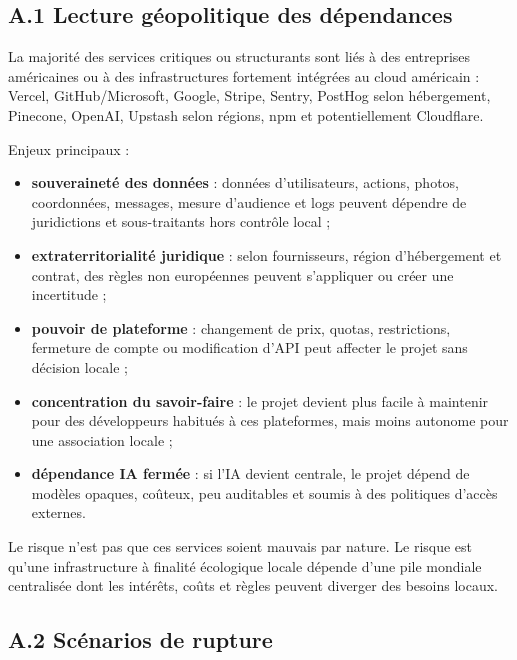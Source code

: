 \documentclass[
  10pt,
  a4paper,
  DIV=11,
  numbers=noendperiod,
  oneside]{scrreprt}
\providecommand{\tightlist}{%
  \setlength{\itemsep}{0pt}\setlength{\parskip}{0pt}}
\let\oldtextbf\textbf
\renewcommand{\textbf}[1]{\oldtextbf{\textcolor{cmmnavy}{#1}}}
\begin{document}
\subsection{A.1 Lecture géopolitique des
dépendances}\label{a.1-lecture-guxe9opolitique-des-duxe9pendances}

La majorité des services critiques ou structurants sont liés à des
entreprises américaines ou à des infrastructures fortement intégrées au
cloud américain : Vercel, GitHub/Microsoft, Google, Stripe, Sentry,
PostHog selon hébergement, Pinecone, OpenAI, Upstash selon régions, npm
et potentiellement Cloudflare.

Enjeux principaux :

\begin{itemize}
\tightlist
\item
  \textbf{souveraineté des données} : données d'utilisateurs, actions,
  photos, coordonnées, messages, mesure d'audience et logs peuvent
  dépendre de juridictions et sous-traitants hors contrôle local ;
\item
  \textbf{extraterritorialité juridique} : selon fournisseurs, région
  d'hébergement et contrat, des règles non européennes peuvent
  s'appliquer ou créer une incertitude ;
\item
  \textbf{pouvoir de plateforme} : changement de prix, quotas,
  restrictions, fermeture de compte ou modification d'API peut affecter
  le projet sans décision locale ;
\item
  \textbf{concentration du savoir-faire} : le projet devient plus facile
  à maintenir pour des développeurs habitués à ces plateformes, mais
  moins autonome pour une association locale ;
\item
  \textbf{dépendance IA fermée} : si l'IA devient centrale, le projet
  dépend de modèles opaques, coûteux, peu auditables et soumis à des
  politiques d'accès externes.
\end{itemize}

Le risque n'est pas que ces services soient mauvais par nature. Le
risque est qu'une infrastructure à finalité écologique locale dépende
d'une pile mondiale centralisée dont les intérêts, coûts et règles
peuvent diverger des besoins locaux.

\subsection{A.2 Scénarios de rupture}\label{a.2-scuxe9narios-de-rupture}
\end{document}
